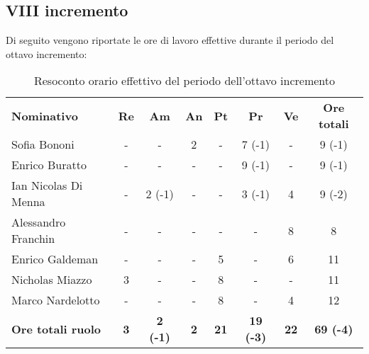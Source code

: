 \documentclass[../piano-di-progetto.tex]{subfiles}
\begin{document}
\subsection{VIII incremento}

Di seguito vengono riportate le ore di lavoro effettive durante il periodo del ottavo incremento:
\begin{table}[H]
    \centering
    \begin{tabular}{lccccccc}
      \rowcolor{lightgray}
      \textbf{Nominativo}       & \textbf{Re}      & \textbf{Am} & \textbf{An}      & \textbf{Pt} & \textbf{Pr} & \textbf{Ve} & \textbf{Ore totali} \\
Sofia Bononi              & -          & -               & 2          & -           & 7 (-1)           & -           & 9 (-1)           \\
Enrico Buratto            & -          & -               & -          & -           & 9 (-1)           & -           & 9 (-1)           \\
Ian Nicolas Di Menna      & -          & 2 (-1)          & -          & -           & 3 (-1)           & 4           & 9 (-2)           \\
Alessandro Franchin       & -          & -               & -          & -           & -                & 8           & 8                \\
Enrico Galdeman           & -          & -               & -          & 5           & -                & 6           & 11               \\
Nicholas Miazzo           & 3          & -               & -          & 8           & -                & -           & 11               \\
Marco Nardelotto          & -          & -               & -          & 8           & -                & 4           & 12               \\
\textbf{Ore totali ruolo} & \textbf{3} & \textbf{2 (-1)} & \textbf{2} & \textbf{21} & \textbf{19 (-3)} & \textbf{22} & \textbf{69 (-4)}
    \end{tabular}
    \caption{Resoconto orario effettivo del periodo dell'ottavo incremento}
  \end{table}
\end{document}
